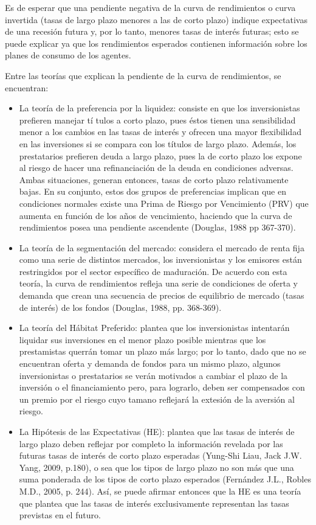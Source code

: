 \hspace*{0.4 cm} Es de esperar que una pendiente negativa de la curva de rendimientos o curva invertida (tasas de largo plazo menores a las de corto plazo) indique expectativas de una recesi\'on futura y, por lo tanto, menores tasas de inter\'es futuras; esto se puede explicar ya que los rendimientos esperados contienen informaci\'on sobre los planes de consumo de los agentes. 

\hspace*{0.4 cm} Entre las teor\'ias que explican la pendiente de la curva de rendimientos, se encuentran:

\begin{itemize}
  \item La teor\'ia de la preferencia por la liquidez: consiste en que los inversionistas prefieren manejar t\'i tulos a corto plazo, pues \'estos tienen una sensibilidad menor a los cambios en las tasas de inter\'es y ofrecen una mayor flexibilidad en las inversiones si se compara con los t\'itulos de largo plazo. Adem\'as, los prestatarios prefieren deuda a largo plazo, pues la de corto plazo los expone al riesgo de hacer una refinanciaci\'on de la deuda en condiciones adversas. Ambas situaciones, generan entonces, tasas de corto plazo relativamente bajas. En su conjunto, estos dos grupos de preferencias implican que en condiciones normales existe una Prima de Riesgo por Vencimiento (PRV) que aumenta en funci\'on de los a\~nos de vencimiento, haciendo que la curva de rendimientos posea una pendiente ascendente (Douglas, 1988 pp 367-370).
  \item La teor\'ia de la segmentaci\'on del mercado: considera el mercado de renta fija como una serie de distintos mercados, los inversionistas y los emisores est\'an restringidos por el sector espec\'ifico de maduraci\'on. De acuerdo con esta teor\'ia, la curva de rendimientos refleja una serie de condiciones de oferta y demanda que crean una secuencia de precios de equilibrio de mercado (tasas de inter\'es) de los fondos (Douglas, 1988, pp. 368-369).
  \item La teor\'ia del H\'abitat Preferido: plantea que los inversionistas intentar\'an liquidar sus inversiones en el menor plazo posible mientras que los prestamistas querr\'an tomar un plazo más largo; por lo tanto, dado que no se encuentran oferta y demanda de fondos para un mismo plazo, algunos inversionistas o prestatarios se ver\'an motivados a cambiar el plazo de la inversi\'on o el financiamiento pero, para lograrlo, deben ser compensados con un premio por el riesgo cuyo tamano reflejar\'a la extesi\'on de la aversi\'on al riesgo.
  \item La Hip\'otesis de las Expectativas (HE): plantea que las tasas de inter\'es de largo plazo deben reflejar por completo la informaci\'on revelada por las futuras tasas de inter\'es de corto plazo esperadas (Yung-Shi Liau, Jack J.W. Yang, 2009, p.180), o sea que los tipos de largo plazo no son m\'as que una suma ponderada de los tipos de corto plazo esperados (Fern\'andez J.L., Robles M.D., 2005, p. 244). As\'i, se puede afirmar entonces que la HE es una teor\'ia que plantea que las tasas de inter\'es exclusivamente representan las tasas previstas en el futuro.
\end{itemize}


